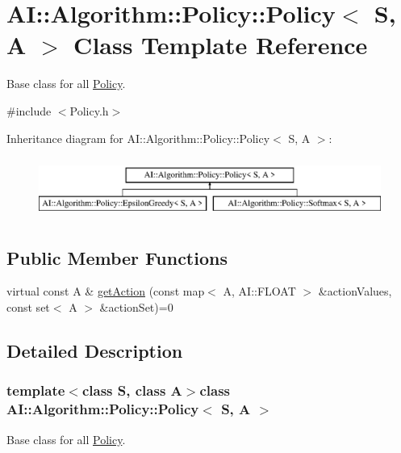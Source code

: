 \hypertarget{classAI_1_1Algorithm_1_1Policy_1_1Policy}{\section{A\-I\-:\-:Algorithm\-:\-:Policy\-:\-:Policy$<$ S, A $>$ Class Template Reference}
\label{classAI_1_1Algorithm_1_1Policy_1_1Policy}
}


Base class for all \hyperlink{classAI_1_1Algorithm_1_1Policy_1_1Policy}{Policy}.  




{\ttfamily \#include $<$Policy.\-h$>$}

Inheritance diagram for A\-I\-:\-:Algorithm\-:\-:Policy\-:\-:Policy$<$ S, A $>$\-:\begin{figure}[H]
\begin{center}
\leavevmode
\includegraphics[height=2.000000cm]{classAI_1_1Algorithm_1_1Policy_1_1Policy}
\end{center}
\end{figure}
\subsection*{Public Member Functions}
\begin{DoxyCompactItemize}
\item 
virtual const A \& \hyperlink{classAI_1_1Algorithm_1_1Policy_1_1Policy_a1bd1f511d0f5dce4f4b080232845852c}{get\-Action} (const map$<$ A, A\-I\-::\-F\-L\-O\-A\-T $>$ \&action\-Values, const set$<$ A $>$ \&action\-Set)=0
\end{DoxyCompactItemize}


\subsection{Detailed Description}
\subsubsection*{template$<$class S, class A$>$class A\-I\-::\-Algorithm\-::\-Policy\-::\-Policy$<$ S, A $>$}

Base class for all \hyperlink{classAI_1_1Algorithm_1_1Policy_1_1Policy}{Policy}. 

